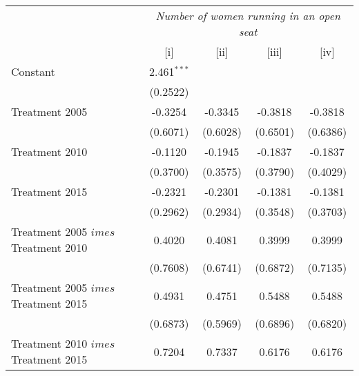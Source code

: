 
\begingroup
\centering
\begin{tabular}{lcccc}
   \toprule
    & \multicolumn{4}{c}{\textit{Number of women running in an open seat}}\\
                                                                     & [i]           & [ii]          & [iii]         & [iv]\\  
   \midrule 
   Constant                                                          & 2.461$^{***}$ &               &               &   \\   
                                                                     & (0.2522)      &               &               &   \\   
   Treatment 2005                                                    & -0.3254       & -0.3345       & -0.3818       & -0.3818\\   
                                                                     & (0.6071)      & (0.6028)      & (0.6501)      & (0.6386)\\   
   Treatment  2010                                                   & -0.1120       & -0.1945       & -0.1837       & -0.1837\\   
                                                                     & (0.3700)      & (0.3575)      & (0.3790)      & (0.4029)\\   
   Treatment 2015                                                    & -0.2321       & -0.2301       & -0.1381       & -0.1381\\   
                                                                     & (0.2962)      & (0.2934)      & (0.3548)      & (0.3703)\\   
   Treatment 2005 $	imes $ Treatment  2010                          & 0.4020        & 0.4081        & 0.3999        & 0.3999\\   
                                                                     & (0.7608)      & (0.6741)      & (0.6872)      & (0.7135)\\   
   Treatment 2005 $	imes $ Treatment 2015                           & 0.4931        & 0.4751        & 0.5488        & 0.5488\\   
                                                                     & (0.6873)      & (0.5969)      & (0.6896)      & (0.6820)\\   
   Treatment  2010 $	imes $ Treatment 2015                          & 0.7204        & 0.7337        & 0.6176        & 0.6176\\   

\end{tabular}
